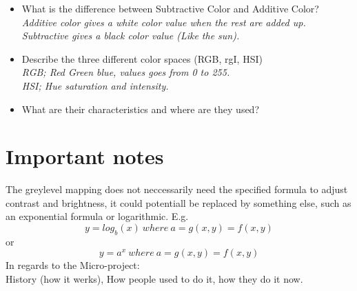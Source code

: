 \documentclass{article}
\begin{document}
\begin{itemize}
   \item What is the difference between Subtractive Color and Additive Color?\\
     \textit{Additive color gives a white color value when the rest are added up.\\Subtractive gives a black color value (Like the sun).}
   \item Describe the three different color spaces (RGB, rgI, HSI)\\
     \textit{RGB; Red Green blue, values goes from 0 to 255.\\HSI; Hue saturation and intensity.}
   \item What are their characteristics and where are they used?
\end{itemize}

\section{Important notes}
The greylevel mapping does not neccessarily need the specified formula to adjust contrast and brightness, it could potentiall be replaced by something else, such as an exponential formula or logarithmic. E.g.$$y = log_b(x) \ where \ a = g(x, y) = f(x, y)$$ or $$y = a^x \ where \ a = g(x, y) = f(x, y)$$
In regards to the Micro-project:\\
History (how it werks), How people used to do it, how they do it now.\\
\end{document}
